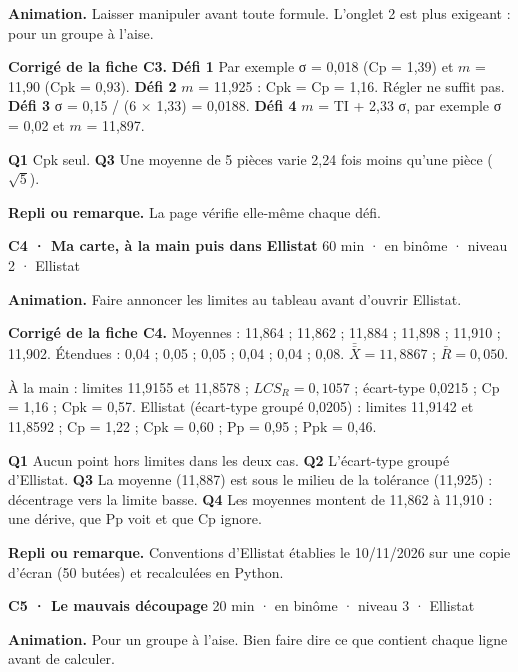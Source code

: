 \textbf{Animation.} Laisser manipuler avant toute formule. L'onglet 2 est plus exigeant : pour un groupe à l'aise.\par
\textbf{\color{ok}Corrigé de la fiche C3.} \textbf{Défi 1} Par exemple σ = 0,018 (Cp = 1,39) et $m$ = 11,90 (Cpk = 0,93). \textbf{Défi 2} $m$ = 11,925 : Cpk = Cp = 1,16. Régler ne suffit pas. \textbf{Défi 3} σ = 0,15 / (6 × 1,33) = 0,0188. \textbf{Défi 4} $m$ = TI + 2,33 σ, par exemple σ = 0,02 et $m$ = 11,897.\par \textbf{Q1} Cpk seul. \textbf{Q3} Une moyenne de 5 pièces varie 2,24 fois moins qu'une pièce ($\sqrt 5$).\par
{\small\textbf{Repli ou remarque.} La page vérifie elle-même chaque défi.}\par
\vspace{3pt}
\begin{tcolorbox}[act]\textbf{C4 · Ma carte, à la main puis dans Ellistat} \hfill {\small 60 min · en binôme · niveau 2 · Ellistat}\end{tcolorbox}
\textbf{Animation.} Faire annoncer les limites au tableau avant d'ouvrir Ellistat.\par
\textbf{\color{ok}Corrigé de la fiche C4.} Moyennes : 11,864 ; 11,862 ; 11,884 ; 11,898 ; 11,910 ; 11,902. Étendues : 0,04 ; 0,05 ; 0,05 ; 0,04 ; 0,04 ; 0,08. $\bar{\bar X} = 11{,}8867$ ; $\bar R = 0{,}050$.\par À la main : limites 11,9155 et 11,8578 ; $LCS_R = 0{,}1057$ ; écart-type 0,0215 ; Cp = 1,16 ; Cpk = 0,57. Ellistat (écart-type groupé 0,0205) : limites 11,9142 et 11,8592 ; Cp = 1,22 ; Cpk = 0,60 ; Pp = 0,95 ; Ppk = 0,46.\par \textbf{Q1} Aucun point hors limites dans les deux cas. \textbf{Q2} L'écart-type groupé d'Ellistat. \textbf{Q3} La moyenne (11,887) est sous le milieu de la tolérance (11,925) : décentrage vers la limite basse. \textbf{Q4} Les moyennes montent de 11,862 à 11,910 : une dérive, que Pp voit et que Cp ignore.\par
{\small\textbf{Repli ou remarque.} Conventions d'Ellistat établies le 10/11/2026 sur une copie d'écran (50 butées) et recalculées en Python.}\par
\vspace{3pt}
\begin{tcolorbox}[act]\textbf{C5 · Le mauvais découpage} \hfill {\small 20 min · en binôme · niveau 3 · Ellistat}\end{tcolorbox}
\textbf{Animation.} Pour un groupe à l'aise. Bien faire dire ce que contient chaque ligne avant de calculer.\par
